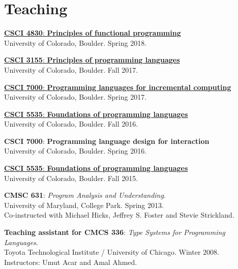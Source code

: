 \documentclass[10pt,letterpaper]{article}
\renewenvironment{itemize}{
  \begin{list}{}{
    \setlength{\leftmargin}{1.5em}
    \setlength{\itemsep}{0.25em}
    \setlength{\parskip}{0pt}
    \setlength{\parsep}{0.25em}
  }
}{
  \end{list}
}
\begin{document}
\section*{Teaching}

\begin{itemize}
 
\item {
  \href{http://matthewhammer.org/courses/pfp-s18/}
  {\textbf{CSCI 4830}: \textbf{Principles of functional programming}}
  \\
  University of Colorado, Boulder.  Spring 2018.
}

\item {
  \href{http://csci3155.cs.colorado.edu/f17/}
  {\textbf{CSCI 3155}: \textbf{Principles of programming languages}}
  \\
  University of Colorado, Boulder.  Fall 2017.
}

\item {
  \href{http://matthewhammer.org/courses/csci7000-s17}
  {\textbf{CSCI 7000}: \textbf{Programming languages for incremental computing}}
  \\
  University of Colorado, Boulder.  Spring 2017.  
}

\item {
  \href{http://matthewhammer.org/courses/csci5535-f16}
  {\textbf{CSCI 5535}: \textbf{Foundations of programming languages}}
  \\
  University of Colorado, Boulder.  Fall 2016. 
}

\item {
  \textbf{CSCI 7000}: \textbf{Programming language design for interaction}
  \\
  University of Colorado, Boulder.  Spring 2016.  
}

\item {
  \href{https://www.cs.colorado.edu/~maha2973/csci5535/f15/}
  {\textbf{CSCI 5535}: \textbf{Foundations of programming languages}}
  \\
  University of Colorado, Boulder.  Fall 2015.  
}

  
\item {
  \textbf{CMSC 631}: \textit{Program Analysis and Understanding}.
  \\
  University of Maryland, College Park.  Spring 2013.
  \\
  Co-instructed with Michael Hicks, Jeffrey S. Foster and Stevie Strickland.
}

\item { 
  \textbf{Teaching assistant for CMCS 336}: \textit{Type Systems for Programming Languages}.
  \\
  Toyota Technological Institute / University of Chicago.  Winter 2008.
  \\
  Instructors: Umut Acar and Amal Ahmed.
}
\end{itemize}
\end{document}
